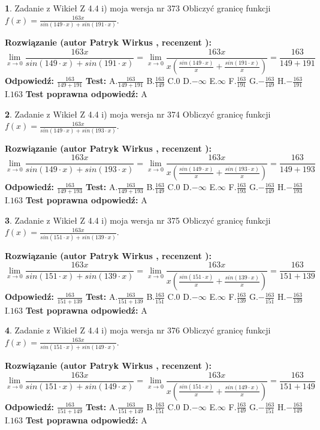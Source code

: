 \documentclass[12pt, a4paper]{article}
\theoremstyle{definition} %
\newtheorem{zad}{}
\newcommand{\zadStart}[1]{\begin{zad}#1\newline}
\newcommand{\zadStop}{\end{zad}}
\newcommand{\rozwStart}[2]{\noindent \textbf{Rozwiązanie (autor #1 , recenzent #2): }\newline}
\newcommand{\rozwStop}{\newline}
\newcommand{\odpStart}{\noindent \textbf{Odpowiedź:}\newline}
\newcommand{\odpStop}{\newline}
\newcommand{\testStart}{\noindent \textbf{Test:}\newline}
\newcommand{\testStop}{\newline}
\newcommand{\kluczStart}{\noindent \textbf{Test poprawna odpowiedź:}\newline}
\newcommand{\kluczStop}{\newline}
\begin{document}
\zadStart{Zadanie z Wikieł Z 4.4 i) moja wersja nr 373}
Obliczyć granicę funkcji $f(x)=\frac{163x}{sin(149\cdot x) +sin(191\cdot x)}$.
\zadStop
\rozwStart{Patryk Wirkus}{}
$$\lim\limits_{x\to 0}\frac{163x}{sin(149\cdot x) +sin(191\cdot x)}=\lim\limits_{x\to 0}\frac{163x}{x(\frac{sin(149\cdot x)}{x}+\frac{sin(191\cdot x)}{x})}=\frac{163}{149+191}$$
\rozwStop
\odpStart
$\frac{163}{149+191}$
\odpStop
\testStart
A.$\frac{163}{149+191}$
B.$\frac{163}{149}$
C.$0$
D.$-\infty$
E.$\infty$
F.$\frac{163}{191}$
G.$-\frac{163}{149}$
H.$-\frac{163}{191}$
I.$163$
\testStop
\kluczStart
A
\kluczStop



\zadStart{Zadanie z Wikieł Z 4.4 i) moja wersja nr 374}
Obliczyć granicę funkcji $f(x)=\frac{163x}{sin(149\cdot x) +sin(193\cdot x)}$.
\zadStop
\rozwStart{Patryk Wirkus}{}
$$\lim\limits_{x\to 0}\frac{163x}{sin(149\cdot x) +sin(193\cdot x)}=\lim\limits_{x\to 0}\frac{163x}{x(\frac{sin(149\cdot x)}{x}+\frac{sin(193\cdot x)}{x})}=\frac{163}{149+193}$$
\rozwStop
\odpStart
$\frac{163}{149+193}$
\odpStop
\testStart
A.$\frac{163}{149+193}$
B.$\frac{163}{149}$
C.$0$
D.$-\infty$
E.$\infty$
F.$\frac{163}{193}$
G.$-\frac{163}{149}$
H.$-\frac{163}{193}$
I.$163$
\testStop
\kluczStart
A
\kluczStop



\zadStart{Zadanie z Wikieł Z 4.4 i) moja wersja nr 375}
Obliczyć granicę funkcji $f(x)=\frac{163x}{sin(151\cdot x) +sin(139\cdot x)}$.
\zadStop
\rozwStart{Patryk Wirkus}{}
$$\lim\limits_{x\to 0}\frac{163x}{sin(151\cdot x) +sin(139\cdot x)}=\lim\limits_{x\to 0}\frac{163x}{x(\frac{sin(151\cdot x)}{x}+\frac{sin(139\cdot x)}{x})}=\frac{163}{151+139}$$
\rozwStop
\odpStart
$\frac{163}{151+139}$
\odpStop
\testStart
A.$\frac{163}{151+139}$
B.$\frac{163}{151}$
C.$0$
D.$-\infty$
E.$\infty$
F.$\frac{163}{139}$
G.$-\frac{163}{151}$
H.$-\frac{163}{139}$
I.$163$
\testStop
\kluczStart
A
\kluczStop



\zadStart{Zadanie z Wikieł Z 4.4 i) moja wersja nr 376}
Obliczyć granicę funkcji $f(x)=\frac{163x}{sin(151\cdot x) +sin(149\cdot x)}$.
\zadStop
\rozwStart{Patryk Wirkus}{}
$$\lim\limits_{x\to 0}\frac{163x}{sin(151\cdot x) +sin(149\cdot x)}=\lim\limits_{x\to 0}\frac{163x}{x(\frac{sin(151\cdot x)}{x}+\frac{sin(149\cdot x)}{x})}=\frac{163}{151+149}$$
\rozwStop
\odpStart
$\frac{163}{151+149}$
\odpStop
\testStart
A.$\frac{163}{151+149}$
B.$\frac{163}{151}$
C.$0$
D.$-\infty$
E.$\infty$
F.$\frac{163}{149}$
G.$-\frac{163}{151}$
H.$-\frac{163}{149}$
I.$163$
\testStop
\kluczStart
A
\kluczStop
\end{document}
